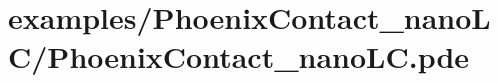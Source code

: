 \hypertarget{examples_2_phoenix_contact_nano_l_c_2_phoenix_contact_nano_l_c_8pde-example}{}\section{examples/\+Phoenix\+Contact\+\_\+nano\+L\+C/\+Phoenix\+Contact\+\_\+nano\+L\+C.\+pde}

\begin{DoxyCodeInclude}
\end{DoxyCodeInclude}
 